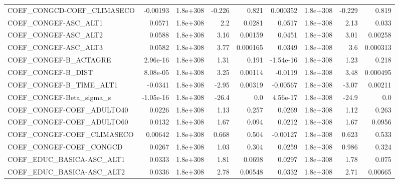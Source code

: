 \begin{tabular}{lrrrrrrrr}
COEF\_CONGCD-COEF\_CLIMASECO        &    -0.00193 &     1.8e+308 &    -0.226 &    0.821 &   0.000352 &    1.8e+308 &       -0.229 &         0.819 \\
COEF\_CONGEF-ASC\_ALT1              &      0.0571 &     1.8e+308 &       2.2 &   0.0281 &     0.0517 &    1.8e+308 &         2.13 &         0.033 \\
COEF\_CONGEF-ASC\_ALT2              &      0.0588 &     1.8e+308 &      3.16 &  0.00159 &     0.0451 &    1.8e+308 &         3.01 &       0.00258 \\
COEF\_CONGEF-ASC\_ALT3              &      0.0582 &     1.8e+308 &      3.77 & 0.000165 &     0.0349 &    1.8e+308 &          3.6 &      0.000313 \\
COEF\_CONGEF-B\_ACTAGRE             &    2.96e-16 &     1.8e+308 &      1.31 &    0.191 &  -1.54e-16 &    1.8e+308 &         1.23 &         0.218 \\
COEF\_CONGEF-B\_DIST                &    8.08e-05 &     1.8e+308 &      3.25 &  0.00114 &    -0.0119 &    1.8e+308 &         3.48 &      0.000495 \\
COEF\_CONGEF-B\_TIME\_ALT1           &     -0.0341 &     1.8e+308 &     -2.95 &  0.00319 &   -0.00567 &    1.8e+308 &        -3.07 &       0.00211 \\
COEF\_CONGEF-Beta\_sigma\_s          &   -1.05e-16 &     1.8e+308 &     -26.4 &      0.0 &   4.56e-17 &    1.8e+308 &        -24.9 &           0.0 \\
COEF\_CONGEF-COEF\_ADULTO40         &      0.0226 &     1.8e+308 &      1.13 &    0.257 &     0.0269 &    1.8e+308 &         1.12 &         0.263 \\
COEF\_CONGEF-COEF\_ADULTO60         &      0.0132 &     1.8e+308 &      1.67 &    0.094 &     0.0212 &    1.8e+308 &         1.67 &        0.0956 \\
COEF\_CONGEF-COEF\_CLIMASECO        &     0.00642 &     1.8e+308 &     0.668 &    0.504 &   -0.00127 &    1.8e+308 &        0.623 &         0.533 \\
COEF\_CONGEF-COEF\_CONGCD           &      0.0267 &     1.8e+308 &      1.03 &    0.304 &     0.0259 &    1.8e+308 &        0.986 &         0.324 \\
COEF\_EDUC\_BASICA-ASC\_ALT1         &      0.0333 &     1.8e+308 &      1.81 &   0.0698 &     0.0297 &    1.8e+308 &         1.78 &         0.075 \\
COEF\_EDUC\_BASICA-ASC\_ALT2         &      0.0336 &     1.8e+308 &      2.78 &  0.00548 &     0.0332 &    1.8e+308 &         2.71 &       0.00665 \\

\end{tabular}
